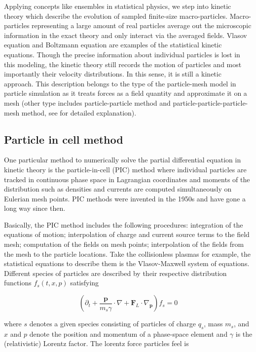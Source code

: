 Applying concepts like ensembles in statistical physics, we step into kinetic theory which describe the evolution of sampled finite-size macro-particles. Macro-particles representing a large amount of real particles average out the microscopic information in the exact theory and only interact via the averaged fields. Vlasov equation and Boltzmann equation are examples of the statistical kinetic equations. Though the precise information about individual particles is lost in this modeling, the kinetic theory still records the motion of particles and most importantly their velocity distributions. In this sense, it is still a kinetic approach. This description belongs to the type of the particle-mesh model in particle simulation as it treats forces as a field quantity and approximate it on a mesh (other type includes particle-particle method and particle-particle-particle-mesh method, see \cite{verboncoeurParticleSimulationPlasmas2005} for detailed explanation).

\subsection{Particle in cell method}

One particular method to numerically solve the partial differential equation in kinetic theory is the particle-in-cell (PIC) method where individual particles are tracked in continuous phase space in Lagrangian coordinates and moments of the distribution such as densities and currents are computed simultaneously on Eulerian mesh points. PIC methods were invented in the 1950s \citep{birdsallPlasmaPhysicsComputer1985} and have gone a long way since then.

Basically, the PIC method includes the following procedures: integration of the equations of motion; interpolation of charge and current source terms to the field mesh; computation of the fields on mesh points; interpolation of the fields from the mesh to the particle locations. Take the collisionless plasmas for example, the statistical equations to describe them is the Vlasov-Maxwell system of equations. Different species of particles are described by their respective distribution functions $f_s(t,x,p)$ satisfying 


$$\left(\partial_{t}+\frac{\mathbf{p}}{m_{s} \gamma} \cdot \nabla+\mathbf{F}_{L} \cdot \nabla_{\mathbf{p}}\right) f_{s}=0$$

where $s$ denotes a given species consisting of particles of charge $q_s$, mass $m_s$, and $x$ and $p$ denote the position and momentum of a phase-space element and $\gamma$ is the (relativistic) Lorentz factor. The lorentz force particles feel is 

